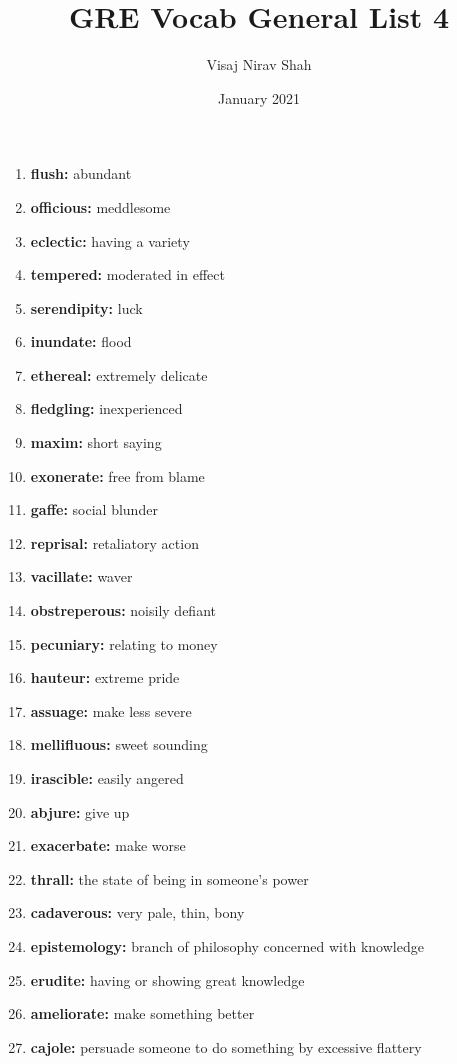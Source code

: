 \documentclass{article}
\title{\textbf{GRE Vocab General List 4}}
\author{Visaj Nirav Shah}
\date{January 2021}
\begin{document}
\maketitle

\begin{enumerate}
    \item \textbf{flush: }{abundant}
    \item \textbf{officious: }{meddlesome}
    \item \textbf{eclectic: }{having a variety}
    \item \textbf{tempered: }{moderated in effect}
    \item \textbf{serendipity: }{luck}
    \item \textbf{inundate: }{flood}
    \item \textbf{ethereal: }{extremely delicate}
    \item \textbf{fledgling: }{inexperienced}
    \item \textbf{maxim: }{short saying}
    \item \textbf{exonerate: }{free from blame}
    \item \textbf{gaffe: }{social blunder}
    \item \textbf{reprisal: }{retaliatory action}
    \item \textbf{vacillate: }{waver}
    \item \textbf{obstreperous: }{noisily defiant}
    \item \textbf{pecuniary: }{relating to money}
    \item \textbf{hauteur: }{extreme pride}
    \item \textbf{assuage: }{make less severe}
    \item \textbf{mellifluous: }{sweet sounding}
    \item \textbf{irascible: }{easily angered}
    \item \textbf{abjure: }{give up}
    \item \textbf{exacerbate: }{make worse}
    \item \textbf{thrall: }{the state of being in someone's power}
    \item \textbf{cadaverous: }{very pale, thin, bony}
    \item \textbf{epistemology: }{branch of philosophy concerned with knowledge}
    \item \textbf{erudite: }{having or showing great knowledge}
    \item \textbf{ameliorate: }{make something better}
    \item \textbf{cajole: }{persuade someone to do something by excessive flattery}

\end{enumerate}
\end{document}
